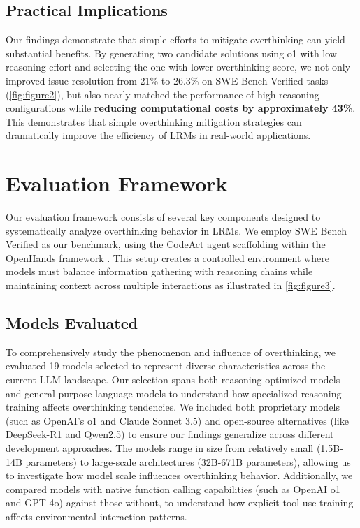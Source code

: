 \subsection{Practical Implications}
Our findings demonstrate that simple efforts to mitigate overthinking can yield substantial benefits. By generating two candidate solutions using o1 with low reasoning effort and selecting the one with lower overthinking score, we not only improved issue resolution from 21\% to 26.3\% on SWE Bench Verified tasks (\cref{fig:figure2}), but also nearly matched the performance of high-reasoning configurations while \textbf{reducing computational costs by approximately 43\%}. This demonstrates that simple overthinking mitigation strategies can dramatically improve the efficiency of LRMs in real-world applications.

\section{Evaluation Framework}
\label{sec:eval_framework}

Our evaluation framework consists of several key components designed to systematically analyze overthinking behavior in LRMs. We employ SWE Bench Verified \cite{jimenez2024swebenchlanguagemodelsresolve, swebench_verified} as our benchmark, using the CodeAct agent scaffolding \cite{wang2024executablecodeactionselicit} within the OpenHands framework \cite{wang2024openhandsopenplatformai}. This setup creates a controlled environment where models must balance information gathering with reasoning chains while maintaining context across multiple interactions as illustrated in \autoref{fig:figure3}.

\subsection{Models Evaluated}
To comprehensively study the phenomenon and influence of overthinking, we evaluated 19 models selected to represent diverse characteristics across the current LLM landscape. Our selection spans both reasoning-optimized models and general-purpose language models to understand how specialized reasoning training affects overthinking tendencies. We included both proprietary models (such as OpenAI's o1 and Claude Sonnet 3.5) and open-source alternatives (like DeepSeek-R1 and Qwen2.5) to ensure our findings generalize across different development approaches. The models range in size from relatively small (1.5B-14B parameters) to large-scale architectures (32B-671B parameters), allowing us to investigate how model scale influences overthinking behavior. Additionally, we compared models with native function calling capabilities (such as OpenAI o1 and GPT-4o) against those without, to understand how explicit tool-use training affects environmental interaction patterns.

